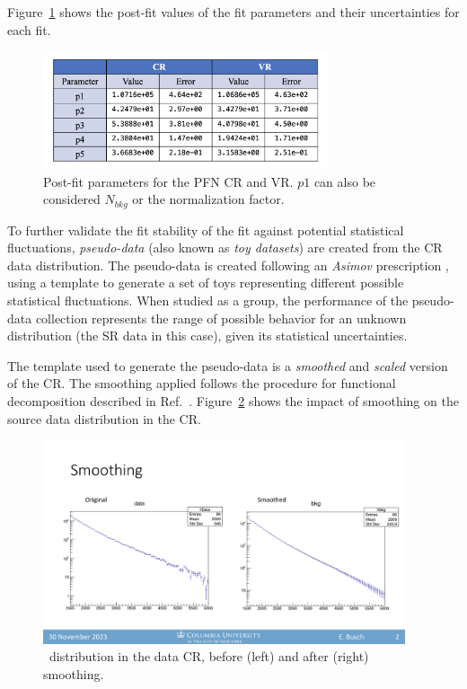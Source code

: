 Figure~\ref{fig:postfit_param_pfn} shows the post-fit values of the fit parameters and their uncertainties for each fit. 
\begin{figure}[!htbp]
\centering
   \includegraphics[width=0.75\textwidth]{figures/stats/postfit_param_pfn}
    \caption{Post-fit parameters for the PFN CR and VR. $p1$ can also be considered $N_{bkg}$ or the normalization factor.
    \label{fig:postfit_param_pfn}}
\end{figure}

To further validate the fit stability of the fit against potential statistical fluctuations, \textit{pseudo-data} (also known as \textit{toy datasets}) are created from the CR data distribution. 
The pseudo-data is created following an \textit{Asimov} prescription \cite{asimov}, using a template to generate a set of toys representing different possible statistical fluctuations.
When studied as a group, the performance of the pseudo-data collection represents the range of possible behavior for an unknown distribution (the SR data in this case), given its statistical uncertainties.

The template used to generate the pseudo-data is a \textit{smoothed} and \textit{scaled} version of the CR. 
The smoothing applied follows the procedure for functional decomposition described in Ref.~\cite{edgar2018functional}.
Figure~\ref{fig:smoothing} shows the impact of smoothing on the source data distribution in the CR.
\begin{figure}[!htbp]
\centering
   \includegraphics[width=0.95\textwidth]{figures/stats/smoothing}
    \caption{\mt~distribution in the data CR, before (left) and after (right) smoothing.
    \label{fig:smoothing}}
\end{figure}

